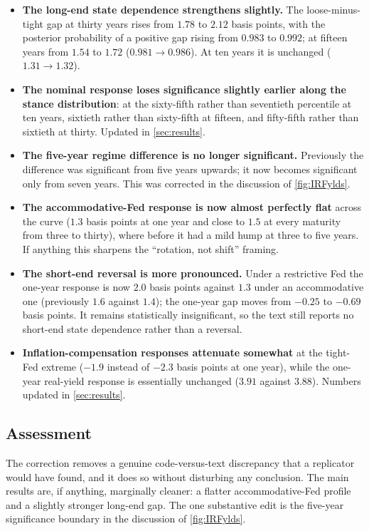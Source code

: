 {\begin{itemize}
\item \textbf{The long-end state dependence strengthens slightly.} The loose-minus-tight gap at
      thirty years rises from $1.78$ to $2.12$ basis points, with the posterior probability of a
      positive gap rising from $0.983$ to $0.992$; at fifteen years from $1.54$ to $1.72$
      ($0.981 \to 0.986$). At ten years it is unchanged ($1.31 \to 1.32$).
\item \textbf{The nominal response loses significance slightly earlier along the stance
      distribution}: at the sixty-fifth rather than seventieth percentile at ten years, sixtieth
      rather than sixty-fifth at fifteen, and fifty-fifth rather than sixtieth at thirty. Updated
      in \autoref{sec:results}.
\item \textbf{The five-year regime difference is no longer significant.} Previously the difference
      was significant from five years upwards; it now becomes significant only from seven years.
      This was corrected in the discussion of \autoref{fig:IRFylds}.
\item \textbf{The accommodative-Fed response is now almost perfectly flat} across the curve ($1.3$
      basis points at one year and close to $1.5$ at every maturity from three to thirty), where
      before it had a mild hump at three to five years. If anything this sharpens the
      ``rotation, not shift'' framing.
\item \textbf{The short-end reversal is more pronounced.} Under a restrictive Fed the one-year
      response is now $2.0$ basis points against $1.3$ under an accommodative one (previously
      $1.6$ against $1.4$); the one-year gap moves from $-0.25$ to $-0.69$ basis points. It remains
      statistically insignificant, so the text still reports no short-end state dependence rather
      than a reversal.
\item \textbf{Inflation-compensation responses attenuate somewhat} at the tight-Fed extreme
      ($-1.9$ instead of $-2.3$ basis points at one year), while the one-year real-yield response
      is essentially unchanged ($3.91$ against $3.88$). Numbers updated in \autoref{sec:results}.
\end{itemize}

\subsection*{Assessment}

The correction removes a genuine code-versus-text discrepancy that a replicator would have found,
and it does so without disturbing any conclusion. The main results are, if anything, marginally
cleaner: a flatter accommodative-Fed profile and a slightly stronger long-end gap. The one
substantive edit is the five-year significance boundary in the discussion of
\autoref{fig:IRFylds}.

}
\clearpage
